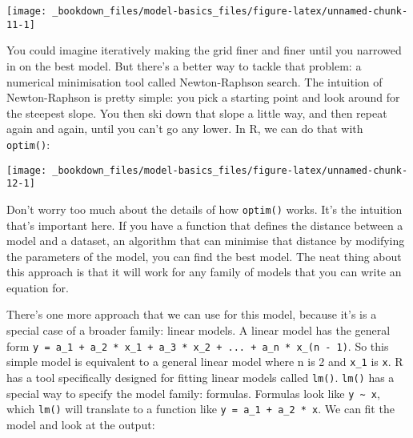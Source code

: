 \documentclass[]{book}
\newenvironment{Shaded}{\begin{snugshade}}{\end{snugshade}}
\newcommand{\KeywordTok}[1]{\textcolor[rgb]{0.13,0.29,0.53}{\textbf{{#1}}}}
\newcommand{\DataTypeTok}[1]{\textcolor[rgb]{0.13,0.29,0.53}{{#1}}}
\newcommand{\DecValTok}[1]{\textcolor[rgb]{0.00,0.00,0.81}{{#1}}}
\newcommand{\StringTok}[1]{\textcolor[rgb]{0.31,0.60,0.02}{{#1}}}
\newcommand{\CommentTok}[1]{\textcolor[rgb]{0.56,0.35,0.01}{\textit{{#1}}}}
\newcommand{\NormalTok}[1]{{#1}}
\begin{document}
\begin{center}\texttt{[image: \_bookdown\_files/model-basics\_files/figure-latex/unnamed-chunk-11-1]} \end{center}

You could imagine iteratively making the grid finer and finer until you
narrowed in on the best model. But there's a better way to tackle that
problem: a numerical minimisation tool called Newton-Raphson search. The
intuition of Newton-Raphson is pretty simple: you pick a starting point
and look around for the steepest slope. You then ski down that slope a
little way, and then repeat again and again, until you can't go any
lower. In R, we can do that with \texttt{optim()}:

\begin{Shaded}
\end{Shaded}

\begin{center}\texttt{[image: \_bookdown\_files/model-basics\_files/figure-latex/unnamed-chunk-12-1]} \end{center}

Don't worry too much about the details of how \texttt{optim()} works.
It's the intuition that's important here. If you have a function that
defines the distance between a model and a dataset, an algorithm that
can minimise that distance by modifying the parameters of the model, you
can find the best model. The neat thing about this approach is that it
will work for any family of models that you can write an equation for.

There's one more approach that we can use for this model, because it's
is a special case of a broader family: linear models. A linear model has
the general form
\texttt{y\ =\ a\_1\ +\ a\_2\ *\ x\_1\ +\ a\_3\ *\ x\_2\ +\ ...\ +\ a\_n\ *\ x\_(n\ -\ 1)}.
So this simple model is equivalent to a general linear model where n is
2 and \texttt{x\_1} is \texttt{x}. R has a tool specifically designed
for fitting linear models called \texttt{lm()}. \texttt{lm()} has a
special way to specify the model family: formulas. Formulas look like
\texttt{y\ \textasciitilde{}\ x}, which \texttt{lm()} will translate to
a function like \texttt{y\ =\ a\_1\ +\ a\_2\ *\ x}. We can fit the model
and look at the output:
\end{document}
